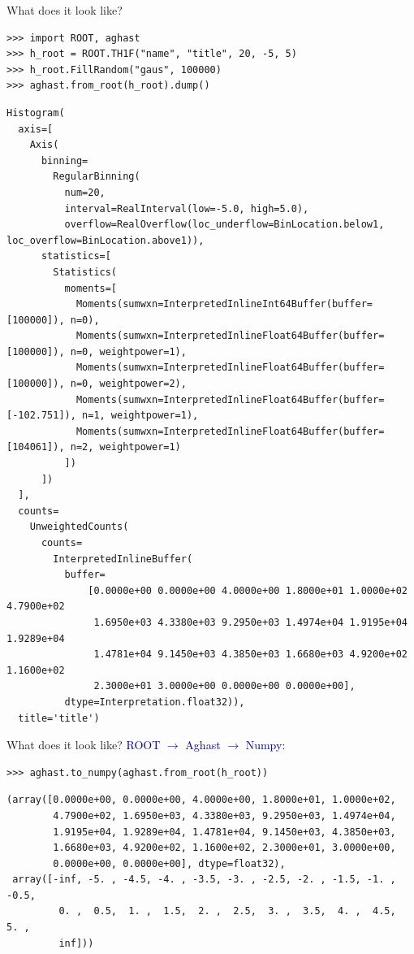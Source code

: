 \documentclass[aspectratio=169]{beamer}
\begin{document}
\begin{frame}[fragile]{What does it look like?}
\small
\begin{verbatim}
>>> import ROOT, aghast
>>> h_root = ROOT.TH1F("name", "title", 20, -5, 5)
>>> h_root.FillRandom("gaus", 100000)
>>> aghast.from_root(h_root).dump()
\end{verbatim}


\tiny
\begin{verbatim}
Histogram(
  axis=[
    Axis(
      binning=
        RegularBinning(
          num=20,
          interval=RealInterval(low=-5.0, high=5.0),
          overflow=RealOverflow(loc_underflow=BinLocation.below1, loc_overflow=BinLocation.above1)),
      statistics=[
        Statistics(
          moments=[
            Moments(sumwxn=InterpretedInlineInt64Buffer(buffer=[100000]), n=0),
            Moments(sumwxn=InterpretedInlineFloat64Buffer(buffer=[100000]), n=0, weightpower=1),
            Moments(sumwxn=InterpretedInlineFloat64Buffer(buffer=[100000]), n=0, weightpower=2),
            Moments(sumwxn=InterpretedInlineFloat64Buffer(buffer=[-102.751]), n=1, weightpower=1),
            Moments(sumwxn=InterpretedInlineFloat64Buffer(buffer=[104061]), n=2, weightpower=1)
          ])
      ])
  ],
  counts=
    UnweightedCounts(
      counts=
        InterpretedInlineBuffer(
          buffer=
              [0.0000e+00 0.0000e+00 4.0000e+00 1.8000e+01 1.0000e+02 4.7900e+02
               1.6950e+03 4.3380e+03 9.2950e+03 1.4974e+04 1.9195e+04 1.9289e+04
               1.4781e+04 9.1450e+03 4.3850e+03 1.6680e+03 4.9200e+02 1.1600e+02
               2.3000e+01 3.0000e+00 0.0000e+00 0.0000e+00],
          dtype=Interpretation.float32)),
  title='title')
\end{verbatim}
\end{frame}

\begin{frame}[fragile]{What does it look like?}
\small
\textcolor{darkblue}{\large ROOT $\to$ Aghast $\to$ Numpy:}
\begin{verbatim}
>>> aghast.to_numpy(aghast.from_root(h_root))
\end{verbatim}

\scriptsize
\begin{verbatim}
(array([0.0000e+00, 0.0000e+00, 4.0000e+00, 1.8000e+01, 1.0000e+02,
        4.7900e+02, 1.6950e+03, 4.3380e+03, 9.2950e+03, 1.4974e+04,
        1.9195e+04, 1.9289e+04, 1.4781e+04, 9.1450e+03, 4.3850e+03,
        1.6680e+03, 4.9200e+02, 1.1600e+02, 2.3000e+01, 3.0000e+00,
        0.0000e+00, 0.0000e+00], dtype=float32),
 array([-inf, -5. , -4.5, -4. , -3.5, -3. , -2.5, -2. , -1.5, -1. , -0.5,
         0. ,  0.5,  1. ,  1.5,  2. ,  2.5,  3. ,  3.5,  4. ,  4.5,  5. ,
         inf]))
\end{verbatim}

\end{frame}
\end{document}
